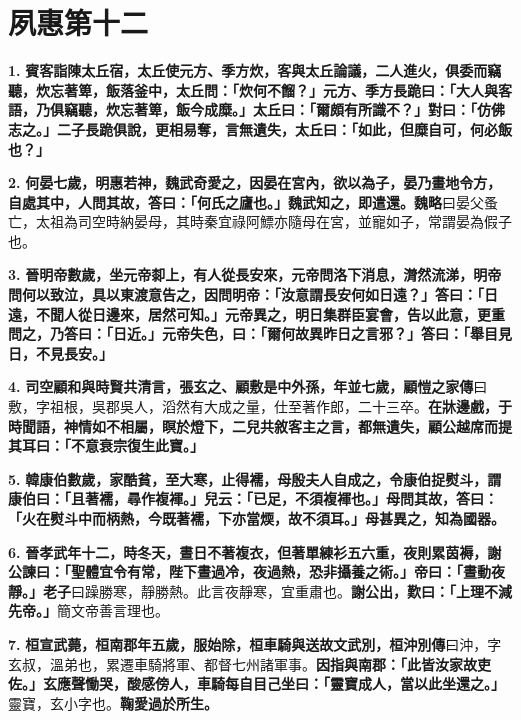 \chapter{夙惠第十二}

\textbf{1.} \textbf{賓客詣陳太丘宿，太丘使元方、季方炊，客與太丘論議，二人進火，俱委而竊聽，炊忘著箄，飯落釜中，太丘問：「炊何不餾？」元方、季方長跪曰：「大人與客語，乃俱竊聽，炊忘著箄，飯今成糜。」太丘曰：「爾頗有所識不？」對曰：「仿佛志之。」二子長跪俱說，更相易奪，言無遺失，太丘曰：「如此，但糜自可，何必飯也？」}

\textbf{2.} \textbf{何晏七歲，明惠若神，魏武奇愛之，因晏在宮內，欲以為子，晏乃畫地令方，自處其中，人問其故，答曰：「何氏之廬也。」魏武知之，即遣還。}{\footnotesize \textbf{魏略}曰晏父蚤亡，太祖為司空時納晏母，其時秦宜祿阿鰾亦隨母在宮，並寵如子，常謂晏為假子也。}

\textbf{3.} \textbf{晉明帝數歲，坐元帝厀上，有人從長安來，元帝問洛下消息，潸然流涕，明帝問何以致泣，具以東渡意告之，因問明帝：「汝意謂長安何如日遠？」答曰：「日遠，不聞人從日邊來，居然可知。」元帝異之，明日集群臣宴會，告以此意，更重問之，乃答曰：「日近。」元帝失色，曰：「爾何故異昨日之言邪？」答曰：「舉目見日，不見長安。」}

\textbf{4.} \textbf{司空顧和與時賢共清言，張玄之、顧敷是中外孫，年並七歲，}{\footnotesize \textbf{顧愷之家傳}曰敷，字祖根，吳郡吳人，滔然有大成之量，仕至著作郎，二十三卒。}\textbf{在牀邊戲，于時聞語，神情如不相屬，瞑於燈下，二兒共敘客主之言，都無遺失，顧公越席而提其耳曰：「不意衰宗復生此寶。」}

\textbf{5.} \textbf{韓康伯數歲，家酷貧，至大寒，止得襦，母殷夫人自成之，令康伯捉熨斗，謂康伯曰：「且著襦，尋作複褌。」兒云：「已足，不須複褌也。」母問其故，答曰：「火在熨斗中而柄熱，今既著襦，下亦當煗，故不須耳。」母甚異之，知為國器。}

\textbf{6.} \textbf{晉孝武年十二，時冬天，晝日不著複衣，但著單練衫五六重，夜則累茵褥，謝公諫曰：「聖體宜令有常，陛下晝過冷，夜過熱，恐非攝養之術。」帝曰：「晝動夜靜。」}{\footnotesize \textbf{老子}曰躁勝寒，靜勝熱。此言夜靜寒，宜重肅也。}\textbf{謝公出，歎曰：「上理不減先帝。」}{\footnotesize 簡文帝善言理也。}

\textbf{7.} \textbf{桓宣武薨，桓南郡年五歲，服始除，桓車騎與送故文武別，}{\footnotesize \textbf{桓沖別傳}曰沖，字玄叔，溫弟也，累遷車騎將軍、都督七州諸軍事。}\textbf{因指與南郡：「此皆汝家故吏佐。」玄應聲慟哭，酸感傍人，車騎每自目己坐曰：「靈寶成人，當以此坐還之。」}{\footnotesize 靈寶，玄小字也。}\textbf{鞠愛過於所生。}